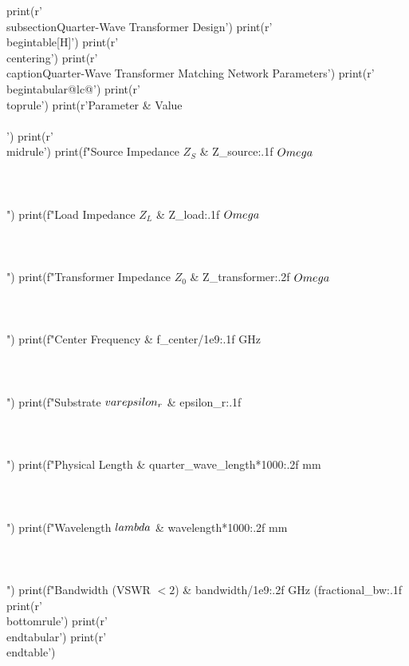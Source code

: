 \documentclass[11pt,a4paper]{article}
\begin{document}
\begin{pycode}
print(r'\\subsection{Quarter-Wave Transformer Design}')
print(r'\\begin{table}[H]')
print(r'\\centering')
print(r'\\caption{Quarter-Wave Transformer Matching Network Parameters}')
print(r'\\begin{tabular}{@{}lc@{}}')
print(r'\\toprule')
print(r'Parameter & Value \\\\')
print(r'\\midrule')
print(f"Source Impedance $Z_S$ & {Z_source:.1f} $\\Omega$ \\\\\\\\")
print(f"Load Impedance $Z_L$ & {Z_load:.1f} $\\Omega$ \\\\\\\\")
print(f"Transformer Impedance $Z_0$ & {Z_transformer:.2f} $\\Omega$ \\\\\\\\")
print(f"Center Frequency & {f_center/1e9:.1f} GHz \\\\\\\\")
print(f"Substrate $\\varepsilon_r$ & {epsilon_r:.1f} \\\\\\\\")
print(f"Physical Length & {quarter_wave_length*1000:.2f} mm \\\\\\\\")
print(f"Wavelength $\\lambda$ & {wavelength*1000:.2f} mm \\\\\\\\")
print(f"Bandwidth (VSWR $< 2$) & {bandwidth/1e9:.2f} GHz ({fractional_bw:.1f}\\%
print(r'\\bottomrule')
print(r'\\end{tabular}')
print(r'\\end{table}')


\end{pycode}
\end{document}
